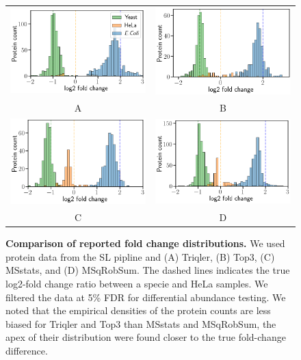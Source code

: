 \documentclass[10pt,letterpaper]{article}
\begin{document}
\begin{figure}[hbt]
    \centering
    \begin{tabular}{cc}
	    \includegraphics[width=0.4\linewidth]{../../result/report_plots_filtered/osw_triqler_intensity.png} & 
	    \includegraphics[width=0.4\linewidth]{../../result/report_plots_filtered/osw_top3_intensity.png} \\ 
        A & B \\ 
	    \includegraphics[width=0.4\linewidth]{../../result/report_plots_filtered/osw_msstats_intensity.png} & 
	    \includegraphics[width=0.4\linewidth]{../../result/report_plots_filtered/osw_msqrobsum_intensity.png} \\
        C & D 
    \end{tabular}
    \caption{{\bf Comparison of reported fold change distributions.} We used protein data from the SL pipline and (A) Triqler, (B) Top3, (C) MSstats, and (D) MSqRobSum. The dashed lines indicates the true log2-fold change ratio between a specie and HeLa samples. We filtered the data at 5\% FDR for differential abundance testing. We noted that the empirical densities of the protein counts are less biased for Triqler and Top3 than MSstats and MSqRobSum, the apex of their distribution were found closer to the true fold-change difference. \label{fig:fc_histogram}} %
\end{figure}
\end{document}
